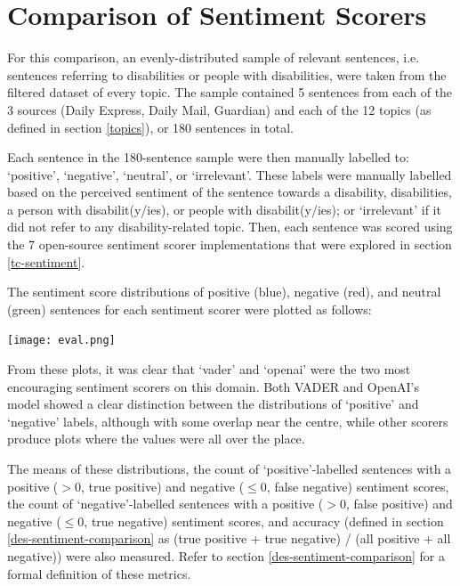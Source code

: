 \documentclass{report}
\begin{document}
\section{Comparison of Sentiment Scorers} \label{Comparison of sentiment scorers}
For this comparison, an evenly-distributed sample of relevant sentences, i.e. sentences referring to disabilities or people with disabilities, were taken from the filtered dataset of every topic. 
The sample contained 5 sentences from each of the 3 sources (Daily Express, Daily Mail, Guardian) and each of the 12 topics (as defined in section \ref{topics}), or 180 sentences in total. %

Each sentence in the 180-sentence sample were then manually labelled to: `positive', `negative', `neutral', or `irrelevant'.
These labels were manually labelled based on the perceived sentiment of the sentence towards a disability, disabilities, a person with disabilit(y/ies), or people with disabilit(y/ies); or `irrelevant' if it did not refer to any disability-related topic.
Then, each sentence was scored using the 7 open-source sentiment scorer implementations that were explored in section \ref{tc-sentiment}.

The sentiment score distributions of positive (blue), negative (red), and neutral (green) sentences for each sentiment scorer were plotted as follows:

\noindent
\texttt{[image: eval.png]}

From these plots, it was clear that `vader' \cite{VADER} and `openai' \cite{OpenAI} were the two most encouraging sentiment scorers on this domain.
Both VADER and OpenAI's model showed a clear distinction between the distributions of `positive' and `negative' labels, although with some overlap near the centre, while other scorers produce plots where the values were all over the place.

The means of these distributions, the count of `positive'-labelled sentences with a positive ($>$0, true positive) and negative ($\le$0, false negative) sentiment scores, the count of `negative'-labelled sentences with a positive ($>$0, false positive) and negative ($\le$0, true negative) sentiment scores, and accuracy (defined in section \ref{des-sentiment-comparison} as (true positive + true negative) / (all positive + all negative)) were also measured.
Refer to section \ref{des-sentiment-comparison} for a formal definition of these metrics.
\end{document}
